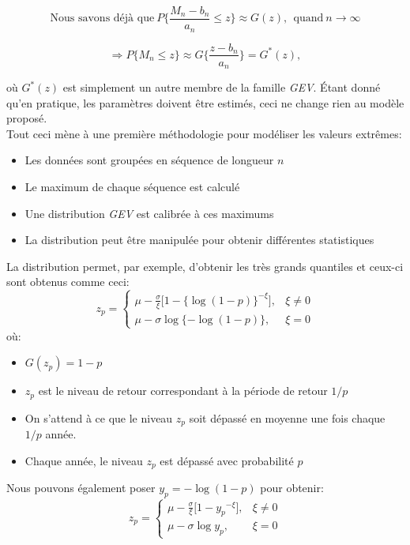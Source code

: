 \documentclass[11pt]{report}
\numberwithin{equation}{section}
\begin{document}
\begin{equation*}
\text{Nous savons déjà que} \ P\Bigg\{\frac{M_n - b_n}{a_n} \le z \Bigg\} \approx G(z), \ \ \text{quand} \ n\to\infty 
\end{equation*}

\begin{equation*}
\Rightarrow P\{M_n\le z\} \approx G\Bigg\{\frac{z- b_n}{a_n}\Bigg\} = G^*(z), 
\end{equation*}

où $G^*(z)$ est simplement un autre membre de la famille \textit{GEV}. Étant donné qu'en pratique, les paramètres doivent être estimés, ceci ne change rien au modèle proposé.\\

Tout ceci mène à une première méthodologie pour modéliser les valeurs extrêmes:

\begin{itemize}
\item Les données sont groupées en séquence de longueur $n$
\item Le maximum de chaque séquence est calculé
\item Une distribution \textit{GEV} est calibrée à ces maximums
\item La distribution peut être manipulée pour obtenir différentes statistiques
\end{itemize}

La distribution permet, par exemple, d'obtenir les très grands quantiles et ceux-ci sont obtenus comme ceci:
\begin{equation}\label{eq:1.1.4}
z_p =
\begin{cases}
\mu - \frac{\sigma}{\xi}\Big[1 - \{\log(1-p)\}^{-\xi}\Big], & \xi \ne 0 \\
\mu - \sigma\log\{-\log(1-p)\}, & \xi = 0
\end{cases}
\end{equation}
où:
\begin{itemize}
\item $G(z_p) = 1-p$
\item $z_p$ est le niveau de retour correspondant à la période de retour ${1}/{p}$
\item On s'attend à ce que le niveau $z_p$ soit dépassé en moyenne une fois chaque $1/p$ année.
\item Chaque année, le niveau $z_p$ est dépassé avec probabilité $p$
\end{itemize}

Nous pouvons également poser $y_p = -\log(1-p)$ pour obtenir:
\begin{equation}\label{eq:1.1.5}
z_p =
\begin{cases}
\mu - \frac{\sigma}{\xi}\Big[1 - {y_p}^{-\xi}\Big], & \xi \ne 0 \\
\mu - \sigma\log{y_p}, & \xi = 0
\end{cases}
\end{equation}
\\
\end{document}
